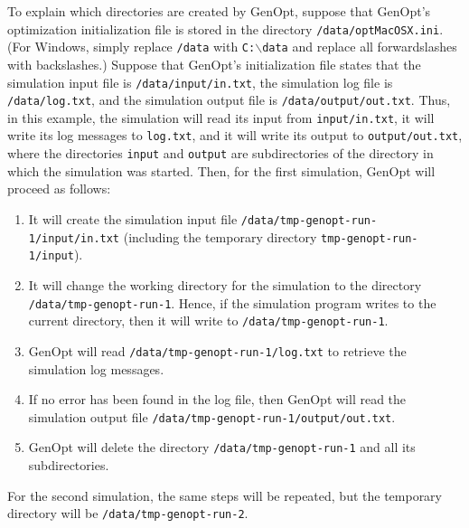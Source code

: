 To explain which directories are created by GenOpt, suppose that GenOpt's 
optimization initialization file is stored in the directory {\tt /data/optMacOSX.ini}.
(For Windows, simply replace {\tt /data} with {\tt C:$\backslash$data} and replace all forwardslashes with
backslashes.) Suppose that GenOpt's initialization file states that the simulation input file
is {\tt /data/input/in.txt}, the simulation log file is {\tt /data/log.txt},
and the simulation output file is {\tt /data/output/out.txt}. 
Thus, in this example, the simulation will 
read its input from {\tt input/in.txt}, 
it will write its log messages to
{\tt log.txt}, and it will write its output
to {\tt output/out.txt}, where the directories {\tt input} and 
{\tt output} are subdirectories of the directory in which
the simulation was started.
Then, for the first simulation, GenOpt will proceed as follows:
\begin{enumerate}
\item It will create the simulation input file {\tt /data/tmp-genopt-run-1/input/in.txt} (including the temporary directory {\tt tmp-genopt-run-1/input}).
\item It will change the working directory for the simulation to the directory {\tt /data/tmp-genopt-run-1}.
Hence, if the simulation program writes to the current directory,
then it will write to {\tt /data/tmp-genopt-run-1}.
\item GenOpt will read {\tt /data/tmp-genopt-run-1/log.txt} to retrieve the simulation log messages.
\item If no error has been found in the log file, then 
GenOpt will read the simulation output file {\tt /data/tmp-genopt-run-1/output/out.txt}.
\item GenOpt will delete the directory {\tt /data/tmp-genopt-run-1} and all its subdirectories.
\end{enumerate}
For the second simulation, the same steps will be repeated, but the temporary directory will be
{\tt /data/tmp-genopt-run-2}.\\

